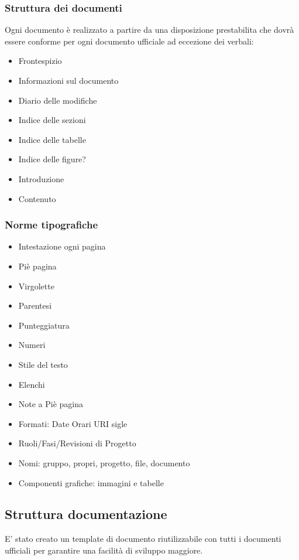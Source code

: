 \documentclass[NormeDiProgetto.tex]{subfiles}
\begin{document}
	\subsubsection{Struttura dei documenti}
		Ogni documento è realizzato a partire da una disposizione prestabilita che dovrà essere conforme per ogni documento ufficiale ad eccezione dei verbali:
		\begin{itemize}
			\item Frontespizio
			\item Informazioni sul documento
			\item Diario delle modifiche
			\item Indice delle sezioni
			\item Indice delle tabelle %
			\item Indice delle figure? %
			\item Introduzione 
			\item Contenuto
		\end{itemize}
		
	\subsubsection{Norme tipografiche}
		\begin{itemize}
			\item Intestazione ogni pagina
			\item Piè pagina
			\item Virgolette
			\item Parentesi
			\item Punteggiatura 
			\item Numeri
			\item Stile del testo 
			\item Elenchi
			\item Note a Piè pagina
			\item Formati: Date Orari URI sigle
			\item Ruoli/Fasi/Revisioni di Progetto
			\item Nomi: gruppo, propri, progetto, file, documento
			\item Componenti grafiche: immagini e tabelle
		\end{itemize}
	
	\subsection{Struttura documentazione}
	E' stato creato un template di documento riutilizzabile con tutti i documenti ufficiali per garantire una facilità di sviluppo maggiore.
	
\end{document}
